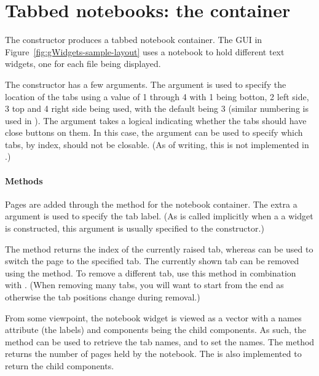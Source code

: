   
\section{Tabbed notebooks: the  container}
\label{sec:gWidgets-gnotebook}

The  constructor produces a tabbed notebook
container. The GUI in Figure~\ref{fig:gWidgets-sample-layout} uses a
notebook to hold different text widgets, one for each file being displayed.

The constructor has a few arguments. The argument
 is used to specify the location of the
tabs using a value of 1 through 4 with 1 being botton, 2 left side, 3
top and 4 right side being used, with the default being 3 (similar
numbering is used in ). The
 argument takes a logical indicating
whether the tabs should have close buttons on them. In this case, the
argument  can be used to specify
which tabs, by index, should not be closable. (As of writing, this is
not implemented in  .)



\paragraph{Methods}
Pages are added through the  method for the
notebook container. The extra a  argument is used
to specify the tab label. (As  is called implicitly when a a
widget is constructed, this argument is usually specified to the
constructor.)



The  method returns the index of the
currently raised tab, whereas  can be
used to switch the page to the specified tab. The currently shown tab
can be removed using the  method. To remove
a different tab, use this method in combination with
. (When removing many tabs, you will want to start
from the end as otherwise the tab positions change during removal.)

From some viewpoint, the notebook widget is viewed as a vector with a
names attribute (the labels) and components being the child
components. As such, the  method can be used
to retrieve the tab names, and  to set
the names. The  method returns the number of
pages held by the notebook. The \meth{[} is also implemented to return the
child components.



